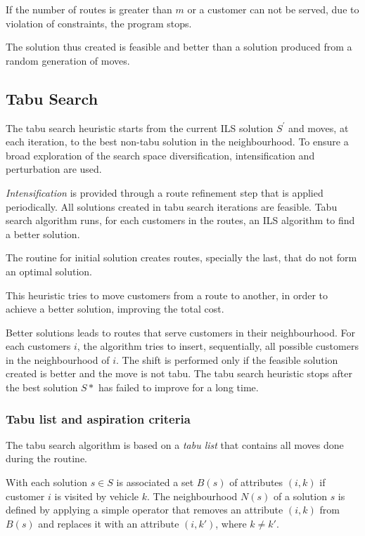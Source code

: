 \documentclass[twoside]{article}
\begin{document}
\begin{multicols}{2}
If the number of routes is greater than $m$ or a customer can not be served, due to violation of constraints, the program stops.

The solution thus created is feasible and better than a solution produced from a random generation of moves.

\subsection{Tabu Search}
The tabu search heuristic starts from the current ILS solution $S^{'}$ and moves, at each iteration, to the best non-tabu solution in the neighbourhood. To ensure a broad exploration of the search space diversification, intensification and perturbation are used.

\textit{Intensification} is provided through a route refinement step that is applied periodically.\newline
All solutions created in tabu search iterations are feasible.\newline
Tabu search algorithm runs, for each customers in the routes, an ILS algorithm to find a better solution.

The routine for initial solution creates routes, specially the last, that do not form an optimal solution.

This heuristic tries to move customers from a route to another, in order to achieve a better solution, improving the total cost. 

Better solutions leads to routes that serve customers in their neighbourhood. For each customers $i$, the algorithm tries to insert, sequentially, all possible customers in the neighbourhood of $i$. The shift is performed only if the feasible solution created is better and the move is not tabu.\newline
The tabu search heuristic stops after the best solution $S*$ has failed to improve for a long time.

\subsubsection{Tabu list and aspiration criteria}
The tabu search algorithm is based on a \textit{tabu list} that contains all moves done during the routine. 

With each solution $s \in S$ is associated a set $B(s)$ of attributes $(i,k)$ if customer $i$ is visited by vehicle $k$. The neighbourhood $N(s)$ of a solution $s$ is defined by applying a simple operator that removes an attribute $(i,k)$ from $B(s)$ and replaces it with an attribute $(i,k')$, where $k\neq k'$. 


\end{multicols}
\end{document}
